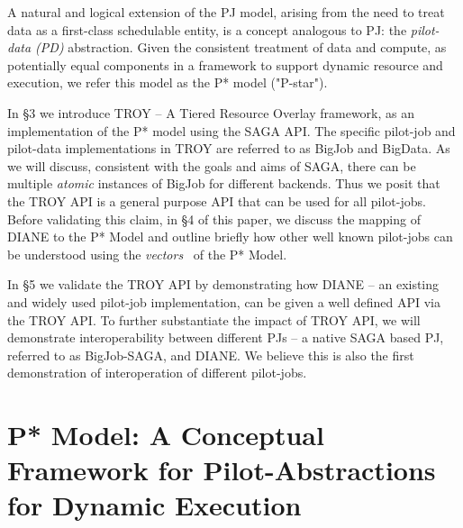 \documentclass[conference,final]{IEEEtran}
\newcommand{\jhanote}[1]{ {\textcolor{red} { ***shantenu: #1 }}}
\newcommand{\jhanote}[1]{}
\newcommand{\upp}{\vspace*{-0.5em}}
\begin{document}
A natural and logical extension of the PJ model, arising from the need to treat
data as a first-class schedulable entity, is a concept analogous to PJ: the
\emph{pilot-data (PD)} abstraction. Given the consistent treatment of data and
compute, as potentially equal components in a framework to support dynamic
resource and execution, we refer this model as the P* model ("P-star").

In \S3 we introduce TROY -- A Tiered Resource Overlay framework, as an
implementation of the P* model using the SAGA API. The specific
pilot-job and pilot-data implementations in TROY are referred to as
BigJob and BigData. As we will discuss, consistent with the goals and
aims of SAGA, there can be multiple {\it atomic} instances of BigJob
for different backends.  Thus we posit that the TROY API is a general
purpose API that can be used for all pilot-jobs. Before validating
this claim, in \S4 of this paper, we discuss the mapping of DIANE to
the P* Model and outline briefly how other well known pilot-jobs can
be understood using the {\it vectors}~\cite{dpa_surveypaper} of the P*
Model.

In \S5 we validate the TROY API by demonstrating how DIANE -- an existing and
widely used pilot-job implementation, can be given a well defined API via the
TROY API. To further substantiate the impact of TROY API, we will demonstrate
interoperability between different PJs -- a native SAGA based PJ, referred to as
BigJob-SAGA, and DIANE. We believe this is also the first demonstration of
interoperation of different pilot-jobs.





\section{P* Model: A Conceptual Framework for Pilot-Abstractions for
  Dynamic Execution \upp\upp}
\label{sec:pilot-model}
\end{document}
